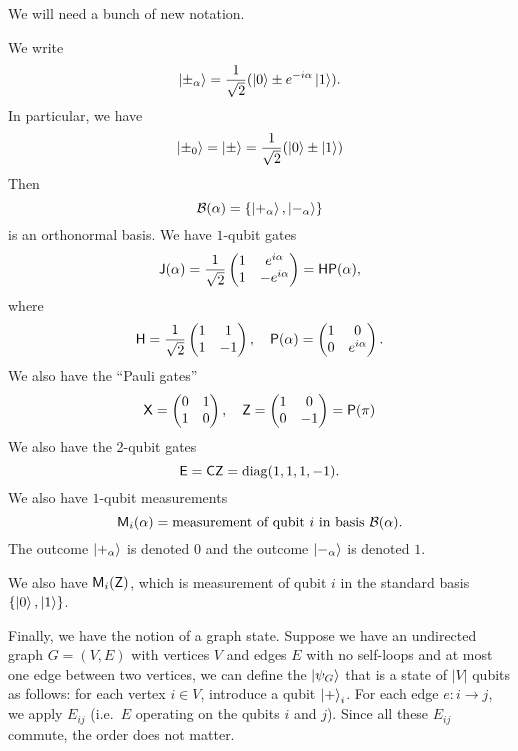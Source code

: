 We will need a bunch of new notation.
\begin{notation}
  We write
  \[
    \left\lvert \pm_\alpha\right\rangle = \frac{1}{\sqrt{2}} (\left\lvert 0\right\rangle \pm e^{-i\alpha} \left\lvert 1\right\rangle).
  \]
  In particular, we have
  \[
    \left\lvert \pm_0\right\rangle = \left\lvert \pm\right\rangle = \frac{1}{\sqrt{2}}(\left\lvert 0\right\rangle \pm \left\lvert 1\right\rangle)
  \]
  Then
  \[
    \mathcal{B}(\alpha) = \{\left\lvert +_\alpha\right\rangle, \left\lvert -_\alpha\right\rangle\}
  \]
  is an orthonormal basis. We have $1$-qubit gates
  \[
    \mathsf{J}(\alpha) = \frac{1}{\sqrt{2}}
    \begin{pmatrix}
      1 & e^{i\alpha}\\
      1 & -e^{i\alpha}
    \end{pmatrix} = \mathsf{H} \mathsf{P}(\alpha),
  \]
  where
  \[
    \mathsf{H} = \frac{1}{\sqrt{2}}
    \begin{pmatrix}
      1 & 1\\
      1 & -1
    \end{pmatrix},\quad \mathsf{P}(\alpha) =
    \begin{pmatrix}
      1 & 0\\
      0 & e^{i\alpha}
    \end{pmatrix}.
  \]
  We also have the ``Pauli gates''
  \[
    \mathsf{X}=
    \begin{pmatrix}
      0 & 1\\
      1 & 0
    \end{pmatrix},\quad
    \mathsf{Z} =
    \begin{pmatrix}
      1 & 0\\
      0 & -1
    \end{pmatrix} = \mathsf{P}(\pi)
  \]
  We also have the 2-qubit gates
  \[
    \mathsf{E} = \mathsf{CZ} = \operatorname{diag}(1, 1, 1, -1).
  \]
  We also have $1$-qubit measurements
  \[
    \mathsf{M}_i(\alpha) = \text{measurement of qubit $i$ in basis $\mathcal{B}(\alpha)$}.
  \]
  The outcome $\left\lvert +_\alpha\right\rangle$ is denoted $0$ and the outcome $\left\lvert -_\alpha\right\rangle$ is denoted $1$.

  We also have $\mathsf{M}_i(\mathsf{Z})$, which is measurement of qubit $i$ in the standard basis $\{\left\lvert 0\right\rangle, \left\lvert 1\right\rangle\}$.

  Finally, we have the notion of a graph state. Suppose we have an undirected graph $G = (V, E)$ with vertices $V$ and edges $E$ with no self-loops and at most one edge between two vertices, we can define the  $\left\lvert \psi_G\right\rangle$ that is a state of $|V|$ qubits as follows: for each vertex $i \in V$, introduce a qubit $\left\lvert +\right\rangle_i$. For each edge $e: i \to j$, we apply $E_{ij}$ (i.e.\ $E$ operating on the qubits $i$ and $j$). Since all these $E_{ij}$ commute, the order does not matter.


\end{notation}

